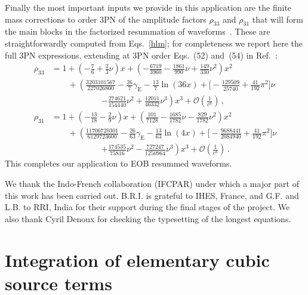 \documentclass[prd,preprint,superscriptaddress,tightenlines,nofootinbib,
  eqsecnum,showpacs]{revtex4}
\begin{document}
Finally the most important inputs we provide in this application are
the finite mass corrections to order 3PN of the amplitude factors
$\rho_{33}$ and $\rho_{31}$ that will form the main blocks in the
factorized resummation of waveforms~\cite{DIN09, FI10, Fuj22PN}. These
are straightforwardly computed from Eqs.~\eqref{hlm}; for completeness
we report here the full 3PN expressions, extending at 3PN order
Eqs.~(52) and~(54) in Ref.~\cite{DIN09}:
%
\begin{subequations} \label{rholm}\begin{align}
\rho_{33} &= 1+ \left(-\frac{7}{6}+\frac{2}{3}\nu\right)x +
\left(-\frac{6719}{3960}-\frac{1861}{990}\nu
+\frac{149}{330}\nu^2\right)x^2 \nonumber\\ &\qquad + \left(
\frac{3203101567}{227026800} - \frac{26}{7}\gamma_\text{E} -
\frac{13}{7}\ln\left(36 x\right) + \biggl[-\frac{129509}{25740} +
  \frac{41}{192} \pi^2 \biggr] \nu
\right.\nonumber\\&\qquad\qquad\qquad \left. - \frac{274621}{154440}
\nu^2 + \frac{12011}{46332} \nu^3\right)x^3 +
\mathcal{O}\left(\frac{1}{c^8}\right) \,, \\ \rho_{31} &= 1+
\left(-\frac{13}{18}-\frac{2}{9}\nu\right)x +
\left(\frac{101}{7128}-\frac{1685}{1782}\nu -
\frac{829}{1782}\nu^2\right)x^2\nonumber\\ &\qquad +
\left(\frac{11706720301}{6129723600} - \frac{26}{63}\gamma_\text{E} -
\frac{13}{63}\ln\left(4 x\right) + \biggl[-\frac{9688441}{2084940} +
  \frac{41}{192} \pi^2 \biggr] \nu
\right.\nonumber\\&\qquad\qquad\qquad \left. + \frac{174535}{75816}
\nu^2 - \frac{727247}{1250964} \nu^3\right)x^3 +
\mathcal{O}\left(\frac{1}{c^8}\right) \,.
\end{align}\end{subequations}
%
This completes our application to EOB resummed waveforms.

\acknowledgments We thank the Indo-French collaboration (IFCPAR) under
which a major part of this work has been carried out. B.R.I. is
grateful to IHES, France, and G.F. and L.B. to RRI, India for their
support during the final stages of the project. We also thank Cyril
Denoux for checking the typesetting of the longest equations.

\appendix

\section{Integration of elementary cubic source terms}
\label{app:cubic_integrals}
\end{document}
